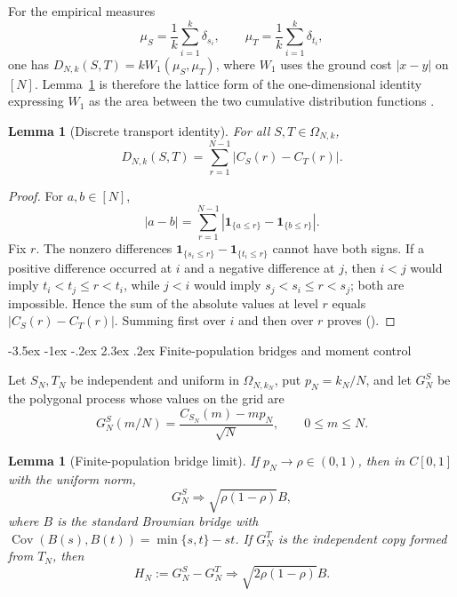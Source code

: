 \documentclass[twoside,10pt]{article}
\makeatletter
\numberwithin{equation}{section}
\theoremstyle{slbody}
\newtheorem{lemma}[theorem]{Lemma}
\theoremstyle{definition}
\theoremstyle{remark}
\newcommand{\1}{\mathbf{1}}
\renewcommand{\section}{%
  \@startsection{section}{1}{\z@}%
    {-3.5ex \@plus -1ex \@minus -.2ex}%
    {2.3ex \@plus .2ex}%
    {\normalfont\large\bfseries}}
\renewcommand{\eqref}[1]{%
  \textup{{\normalfont(\oldstylenums{\ref{#1}}}\normalfont)}}
\makeatother
\begin{document}
For the empirical measures
\[
 \mu_S=\frac1k\sum_{i=1}^k\delta_{s_i},
 \qquad
 \mu_T=\frac1k\sum_{i=1}^k\delta_{t_i},
\]
one has
$D_{N,k}(S,T)=kW_1(\mu_S,\mu_T)$, where $W_1$ uses the ground cost
$|x-y|$ on $[N]$.  Lemma~\ref{lem:transport} is therefore the
lattice form of the one-dimensional identity expressing $W_1$ as the area
between the two cumulative distribution functions
\cite{Vallender,DeAngelisGray}.

\begin{lemma}[Discrete transport identity]\label{lem:transport}
For all $S,T\in\Omega_{N,k}$,
\begin{equation}\label{eq:transport}
 D_{N,k}(S,T)=\sum_{r=1}^{N-1}|C_S(r)-C_T(r)|.
\end{equation}
\end{lemma}

\begin{proof}
For $a,b\in[N]$,
\[
 |a-b|=\sum_{r=1}^{N-1}|\1_{\{a\leq r\}}-\1_{\{b\leq r\}}|.
\]
Fix $r$.  The nonzero differences
$\1_{\{s_i\leq r\}}-\1_{\{t_i\leq r\}}$ cannot have both signs.  If a
positive difference occurred at $i$ and a negative difference at $j$, then
$i<j$ would imply $t_i<t_j\leq r<t_i$, while $j<i$ would imply
$s_j<s_i\leq r<s_j$; both are impossible.  Hence the sum of the absolute
values at level $r$ equals
$|C_S(r)-C_T(r)|$.  Summing first over $i$ and then over $r$ proves
\eqref{eq:transport}.
\end{proof}

\section{Finite-population bridges and moment control}

Let $S_N,T_N$ be independent and uniform in $\Omega_{N,k_N}$, put
$p_N=k_N/N$, and let $G_N^S$ be the polygonal process whose values on the
grid are
\begin{equation}\label{eq:single-bridge}
 G_N^S(m/N)=\frac{C_{S_N}(m)-mp_N}{\sqrt N},
 \qquad 0\leq m\leq N.
\end{equation}

\begin{lemma}[Finite-population bridge limit]\label{lem:bridge-fclt}
If $p_N\to\rho\in(0,1)$, then in $C[0,1]$ with the uniform norm,
\[
 G_N^S\Rightarrow\sqrt{\rho(1-\rho)}B,
\]
where $B$ is the standard Brownian bridge with
$\operatorname{Cov}(B(s),B(t))=\min\{s,t\}-st$.  If $G_N^T$ is the
independent copy formed from $T_N$, then
\begin{equation}\label{eq:difference-bridge}
 H_N:=G_N^S-G_N^T
 \Rightarrow \sqrt{2\rho(1-\rho)}B.
\end{equation}
\end{lemma}
\end{document}

